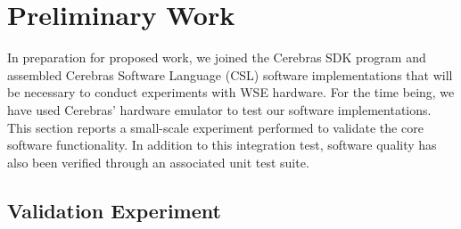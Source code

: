 \section{Preliminary Work} \label{sec:preliminary-work}

In preparation for proposed work, we joined the Cerebras SDK program \citep{selig2022cerebras} and assembled Cerebras Software Language (CSL) software implementations that will be necessary to conduct experiments with WSE hardware.
For the time being, we have used Cerebras' hardware emulator to test our software implementations.
This section reports a small-scale experiment performed to validate the core software functionality.
In addition to this integration test, software quality has also been verified through an associated unit test suite.

\subsection{Validation Experiment}


